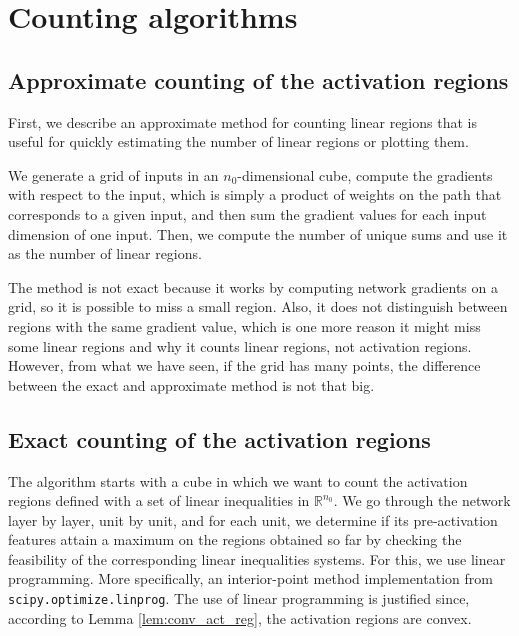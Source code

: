 \documentclass{article}
\theoremstyle{definition}
\newcommand{\nin}{n_0}
\begin{document}
\section{Counting algorithms}
\label{app:algorithm}

\subsection{Approximate counting of the activation regions}

First, we describe an approximate method for counting linear regions that is useful for quickly estimating the number of linear regions or plotting them.

We generate a grid of inputs in an $\nin$-dimensional cube, compute the gradients with respect to the input, which is simply a product of weights on the path that corresponds to a given input, and then sum the gradient values for each input dimension of one input. Then, we compute the number of unique sums and use it as the number of linear regions.
 
The method is not exact because it works by computing network gradients on a grid, so it is possible to miss a small region. Also, it does not distinguish between regions with the same gradient value, which is one more reason it might miss some linear regions and why it counts linear regions, not activation regions. However, from what we have seen, if the grid has many points, the difference between the exact and approximate method is not that big.

\subsection{Exact counting of the activation regions}
\label{subseq:exact_regions}

The algorithm starts with a cube in which we want to count the activation regions defined with a set of linear inequalities in $\mathbb{R}^{\nin}$.
We go through the network layer by layer, unit by unit, and for each unit, we determine if its pre-activation features attain a maximum on the regions obtained so far by checking the feasibility of the corresponding linear inequalities systems.
For this, we use linear programming.
More specifically, an interior-point method implementation from \texttt{scipy.optimize.linprog}.
The use of linear programming is justified since, according to Lemma \ref{lem:conv_act_reg}, the activation regions are convex.
\end{document}
